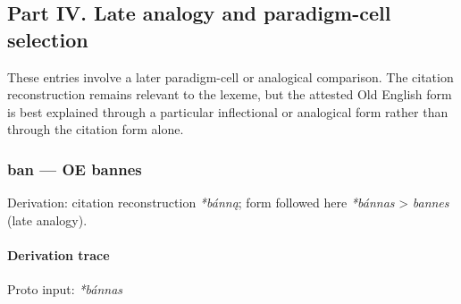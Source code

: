 \documentclass[
  british,
  a4paper,
]{article}
\begin{document}
\clearpage

\subsection{Part IV. Late analogy and paradigm-cell
selection}\label{part-iv.-late-analogy-and-paradigm-cell-selection}

These entries involve a later paradigm-cell or analogical comparison.
The citation reconstruction remains relevant to the lexeme, but the
attested Old English form is best explained through a particular
inflectional or analogical form rather than through the citation form
alone.

\subsubsection{ban --- OE bannes}\label{ban-oe-bannes}

Derivation: citation reconstruction \emph{*bánną}; form followed here
\emph{*bánnas} \textgreater{} \emph{bannes} (late analogy).

\paragraph{Derivation trace}\label{derivation-trace-39}

Proto input: \emph{*bánnas}

\begingroup
\setlength{\fboxsep}{6pt}
\end{document}
